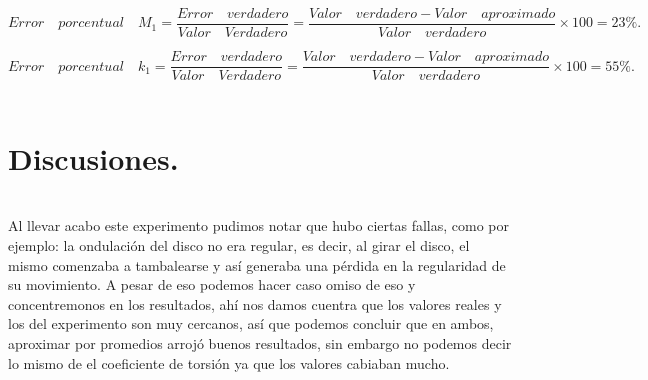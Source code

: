 \documentclass[10pt,a4paper]{article}
\begin{document}
\[{ E }rror\quad porcentual\quad { M }_{ 1 }=\frac { Error\quad verdadero }{ Valor\quad Verdadero } =\frac { Valor\quad verdadero - Valor\quad aproximado }{ Valor\quad verdadero } \times 100= 23\%. \]

\[{ E }rror\quad porcentual\quad { k }_{ 1 }=\frac { Error\quad verdadero }{ Valor\quad Verdadero } =\frac { Valor\quad verdadero - Valor\quad aproximado }{ Valor\quad verdadero } \times 100= 55\%. \]
\\
 \section*{Discusiones.}\\
Al llevar acabo este experimento pudimos notar que hubo ciertas fallas, como por ejemplo: la ondulaci\'{o}n del disco no era regular, es decir, al girar el disco, el mismo comenzaba a tambalearse y as\'{i} generaba una p\'{e}rdida en la regularidad de su movimiento. A pesar de eso podemos hacer caso omiso de eso y concentremonos en los resultados, ah\'{i} nos damos cuentra que los valores reales y los del experimento son muy cercanos, as\'{i} que podemos concluir que en ambos, aproximar por promedios arroj\'{o} buenos resultados, sin embargo no podemos decir lo mismo de el coeficiente de torsi\'{o}n ya que los valores cabiaban mucho.
\end{document}
